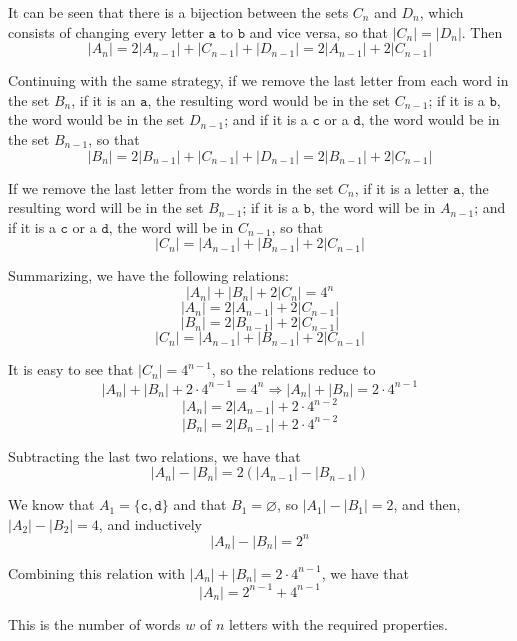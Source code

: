 \documentclass[../../main.tex]{subfiles}
\begin{document}
  It can be seen that there is a bijection between the sets $C_n$ and $D_n$, which consists of changing every letter $\mathtt{a}$ to $\mathtt{b}$ and vice versa, so that $|C_n| = |D_n|$. Then
  $$
  |A_n| = 2 |A_{n - 1}| + |C_{n - 1}| + |D_{n - 1}| = 2 |A_{n - 1}| + 2 |C_{n - 1}|
  $$

  Continuing with the same strategy, if we remove the last letter from each word in the set $B_n$, if it is an $\mathtt{a}$, the resulting word would be in the set $C_{n - 1}$; if it is a $\mathtt{b}$, the word would be in the set $D_{n - 1}$; and if it is a $\mathtt{c}$ or a $\mathtt{d}$, the word would be in the set $B_{n - 1}$, so that
  $$
  |B_n| = 2 |B_{n - 1}| + |C_{n - 1}| + |D_{n - 1}| = 2 |B_{n - 1}| + 2 |C_{n - 1}|
  $$

  If we remove the last letter from the words in the set $C_n$, if it is a letter $\mathtt{a}$, the resulting word will be in the set $B_{n - 1}$; if it is a $\mathtt{b}$, the word will be in $A_{n - 1}$; and if it is a $\mathtt{c}$ or a $\mathtt{d}$, the word will be in $C_{n - 1}$, so that
  $$
  |C_n| = |A_{n - 1}| + |B_{n - 1}| + 2 |C_{n - 1}|
  $$

  Summarizing, we have the following relations:
  $$
  |A_n| + |B_n| + 2 |C_n| = 4^n
  $$
  $$
  |A_n| = 2 |A_{n - 1}| + 2 |C_{n - 1}|
  $$
  $$
  |B_n| = 2 |B_{n - 1}| + 2 |C_{n - 1}|
  $$
  $$
  |C_n| = |A_{n - 1}| + |B_{n - 1}| + 2 |C_{n - 1}|
  $$

  It is easy to see that $|C_n| = 4^{n - 1}$, so the relations reduce to
  $$
  |A_n| + |B_n| + 2 \cdot 4^{n - 1} = 4^n \Longrightarrow |A_n| + |B_n| = 2 \cdot 4^{n - 1}
  $$
  $$
  |A_n| = 2 |A_{n - 1}| + 2 \cdot 4^{n - 2}
  $$
  $$
  |B_n| = 2 |B_{n - 1}| + 2 \cdot 4^{n - 2}
  $$

  Subtracting the last two relations, we have that
  $$
  |A_n| - |B_n| = 2 \left(|A_{n - 1}| - |B_{n - 1}|\right)
  $$

  We know that $A_{1} = \{\mathtt{c}, \mathtt{d}\}$ and that $B_1 = \varnothing$, so $|A_1| - |B_1| = 2$, and then, $|A_2| - |B_2| = 4$, and inductively
  $$
  |A_n| - |B_n| = 2^n
  $$

  Combining this relation with $|A_n| + |B_n| = 2 \cdot 4^{n - 1}$, we have that
  $$
  |A_n| = 2^{n - 1} + 4^{n - 1}
  $$

  This is the number of words $w$ of $n$ letters with the required properties.
\end{document}
